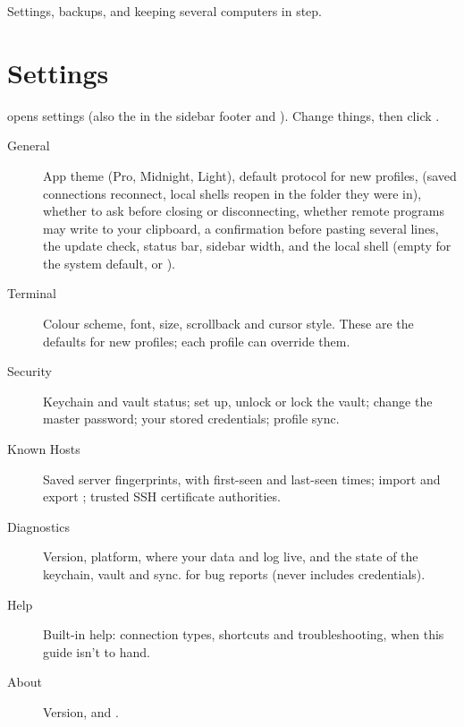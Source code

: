   {Settings, backups, and keeping several computers in step.}
  {
   }

\chapter{Settings}\label{ch:settings}

\keys{\mod+,} opens settings (also the \iGear{} in the sidebar footer and ). Change things,
then click .

\begin{center}\begin{minipage}[t]{0.49\linewidth}\end{minipage}\hfill\begin{minipage}[t]{0.49\linewidth}\end{minipage}\end{center}

\begin{description}
  \item[General] App theme (Pro, Midnight, Light), default protocol for new profiles, 
        (saved connections reconnect, local shells reopen in the folder they were in), whether to ask before closing or
        disconnecting, whether remote programs may write to your clipboard, a confirmation before pasting several lines,
        the update check, status bar, sidebar width, and the local shell (empty for the system default, or
        ).
  \item[Terminal] Colour scheme, font, size, scrollback and cursor style. These are the defaults for new profiles;
        each profile can override them.
  \item[Security] Keychain and vault status; set up, unlock or lock the vault; change the master password; your
        stored credentials; profile sync.
  \item[Known Hosts] Saved server fingerprints, with first-seen and last-seen times; import and export
        ; trusted SSH certificate authorities.
  \item[Diagnostics] Version, platform, where your data and log live, and the state of the keychain, vault and sync.
         for bug reports (never includes credentials).
  \item[Help] Built-in help: connection types, shortcuts and troubleshooting, when this guide isn't to hand.
  \item[About] Version,  and .
\end{description}

